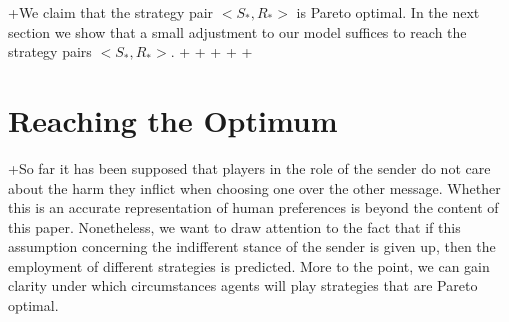 \documentclass[10pt]{article}
\begin{document}
+We claim that the strategy pair $<S_*,R_*>$ is Pareto optimal. In the next section we show that a small adjustment to our model suffices to reach the strategy pairs $<S_*,R_*>$.
+%
+%
+%
+%
+\section{Reaching the Optimum}
+So far it has been supposed that players in the role of the sender do not care about the harm they inflict when choosing one over the other message. Whether this is an accurate representation of human preferences is beyond the content of this paper. Nonetheless, we want to draw attention to the fact that if this assumption concerning the indifferent stance of the sender is given up, then the employment of different strategies is predicted. More to the point, we can gain clarity under which circumstances agents will play strategies that are Pareto optimal.
\end{document}
